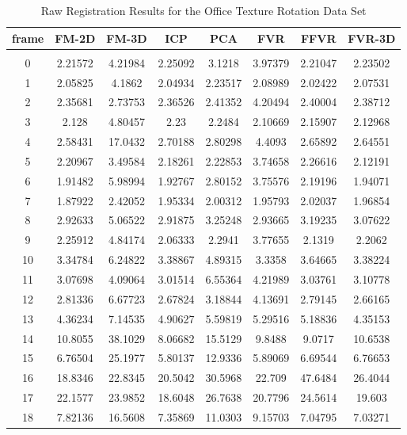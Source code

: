 \begin{center}
\begin{longtable}{cccccccc}
\caption{Raw Registration Results for the Office Texture Rotation Data Set}
\label{tab:officetexturerotationFULL}
\endfirsthead
\endhead
\textbf{frame} & \textbf{FM-2D} & \textbf{FM-3D} & \textbf{ICP} & \textbf{PCA} & \textbf{FVR} & \textbf{FFVR} & \textbf{FVR-3D} \\
\hline \\
0 & 2.21572 & 4.21984 & 2.25092 & 3.1218 & 3.97379 & 2.21047 & 2.23502\\
1 & 2.05825 & 4.1862 & 2.04934 & 2.23517 & 2.08989 & 2.02422 & 2.07531\\
2 & 2.35681 & 2.73753 & 2.36526 & 2.41352 & 4.20494 & 2.40004 & 2.38712\\
3 & 2.128 & 4.80457 & 2.23 & 2.2484 & 2.10669 & 2.15907 & 2.12968\\
4 & 2.58431 & 17.0432 & 2.70188 & 2.80298 & 4.4093 & 2.65892 & 2.64551\\
5 & 2.20967 & 3.49584 & 2.18261 & 2.22853 & 3.74658 & 2.26616 & 2.12191\\
6 & 1.91482 & 5.98994 & 1.92767 & 2.80152 & 3.75576 & 2.19196 & 1.94071\\
7 & 1.87922 & 2.42052 & 1.95334 & 2.00312 & 1.95793 & 2.02037 & 1.96854\\
8 & 2.92633 & 5.06522 & 2.91875 & 3.25248 & 2.93665 & 3.19235 & 3.07622\\
9 & 2.25912 & 4.84174 & 2.06333 & 2.2941 & 3.77655 & 2.1319 & 2.2062\\
10 & 3.34784 & 6.24822 & 3.38867 & 4.89315 & 3.3358 & 3.64665 & 3.38224\\
11 & 3.07698 & 4.09064 & 3.01514 & 6.55364 & 4.21989 & 3.03761 & 3.10778\\
12 & 2.81336 & 6.67723 & 2.67824 & 3.18844 & 4.13691 & 2.79145 & 2.66165\\
13 & 4.36234 & 7.14535 & 4.90627 & 5.59819 & 5.29516 & 5.18836 & 4.35153\\
14 & 10.8055 & 38.1029 & 8.06682 & 15.5129 & 9.8488 & 9.0717 & 10.6538\\
15 & 6.76504 & 25.1977 & 5.80137 & 12.9336 & 5.89069 & 6.69544 & 6.76653\\
16 & 18.8346 & 22.8345 & 20.5042 & 30.5968 & 22.709 & 47.6484 & 26.4044\\
17 & 22.1577 & 23.9852 & 18.6048 & 26.7638 & 20.7796 & 24.5614 & 19.603\\
18 & 7.82136 & 16.5608 & 7.35869 & 11.0303 & 9.15703 & 7.04795 & 7.03271\\

\end{longtable}
\end{center}
